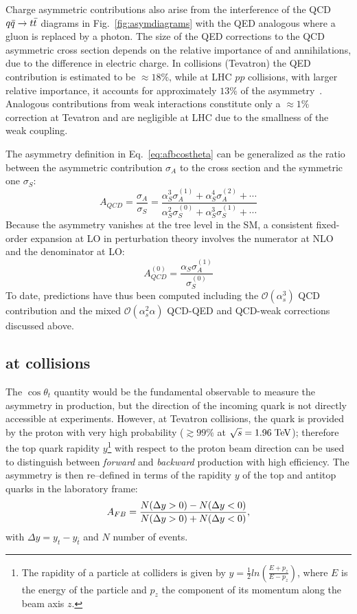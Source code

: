 Charge asymmetric contributions also arise from the interference of
the QCD \mbox{$q\bar{q}{}\to{}t\bar{t}{}$} diagrams in
Fig.~\ref{fig:asymdiagrams} with the QED analogous where a gluon is
replaced by a photon. The size of the QED corrections to the QCD
asymmetric cross section depends on the relative importance of \uubar{}
and \ddbar{} annihilations, due to the difference in electric charge.
In \ppbar{} collisions (Tevatron) the QED contribution is estimated to
be $\approx{}18\%$, while at LHC $pp$ collisions, with larger relative
\ddbar{} importance, it accounts for approximately $13\%$ of the
asymmetry~\cite{Kuhn:2011ri}.
Analogous contributions from weak interactions constitute only a
$\approx{}1\%$ correction at Tevatron and are negligible at LHC due to
the smallness of the weak coupling.

The asymmetry definition in Eq.~\ref{eq:afbcostheta} can be
generalized as the ratio between the asymmetric contribution
$\sigma_A$ to the cross section and the symmetric one $\sigma_S$:
\begin{equation}
  A_{QCD} = \frac{\sigma_A}{\sigma_S} = 
  \frac{\alpha_S^3\sigma_A^{(1)}+\alpha_S^4\sigma_A^{(2)}+\cdots{}}
  {\alpha_S^2\sigma_S^{(0)}+\alpha_S^3\sigma_S^{(1)}+\cdots{}}
\end{equation}
Because the asymmetry vanishes at the tree level in the SM, a
consistent fixed-order expansion at LO in perturbation theory involves the
numerator at NLO and the denominator at LO:
\begin{equation}
  A_{QCD}^{(0)}=\frac{\alpha_S\sigma_A^{(1)}}{\sigma_S^{(0)}}
\end{equation}
To date, predictions have thus been computed including the $\mathcal{O}(\alpha_s^3)$
QCD contribution and the mixed $\mathcal{O}(\alpha_s^2\alpha)$ QCD-QED
and QCD-weak corrections discussed above. 

\subsection{\afb{} at \ppbar{} collisions}

The $\cos\theta_t$ quantity would be the fundamental observable to
measure the asymmetry in \ttbar{} production, but the direction of the
incoming quark is not directly accessible at experiments. However, at
Tevatron \ppbar{} collisions, the quark is provided by the proton with
very high probability ($\gtrsim{}99\%$ at $\sqrt{s}=1.96\; \mathrm{TeV}{}$);
therefore the top quark rapidity $y$\footnote{The rapidity of a
  particle at colliders is given by
  $y=\frac{1}{2}ln(\frac{E+p_z}{E-p_z})$, where $E$ is the energy of
  the particle and $p_z$ the component of its momentum along the beam
  axis $z$.} with respect to the proton beam direction can be used to
distinguish between {\it forward} and {\it backward} production with
high efficiency.
The asymmetry \afb{} is then re--defined in terms of the rapidity $y$ of the top and
antitop quarks in the laboratory frame: 
\begin{equation}
\label{eq:afb}
A_{FB}{}=\frac{N(\Delta{}y>0)-N(\Delta{}y<0)}{N(\Delta{}y>0)+N(\Delta{}y<0)},
\end{equation}
with $\Delta{}y=y_t - y_{\bar{t}}$ and $N$ number of events.

